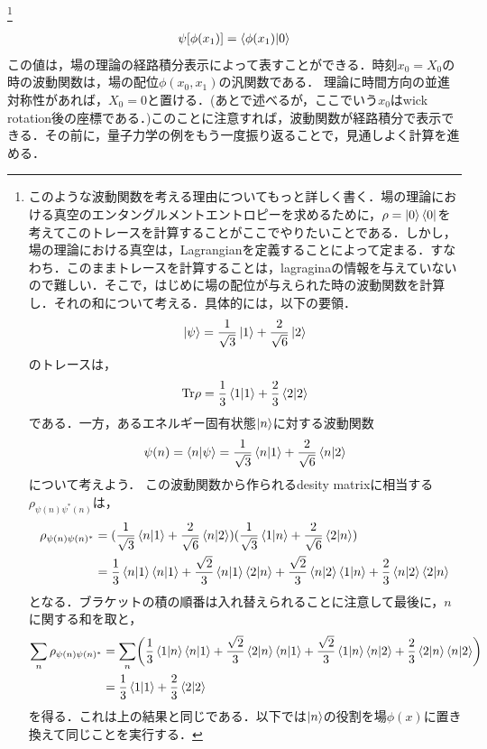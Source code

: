 \footnote{このような波動関数を考える理由についてもっと詳しく書く．場の理論における真空のエンタングルメントエントロピーを求めるために，$\rho=\ket{0}\bra{0}$を考えてこのトレースを計算することがここでやりたいことである．しかし，場の理論における真空は，Lagrangianを定義することによって定まる．すなわち．このままトレースを計算することは，lagraginaの情報を与えていないので難しい．そこで，はじめに場の配位が与えられた時の波動関数を計算し．それの和について考える．具体的には，以下の要領．
\begin{align}
  \ket{\psi}=\frac{1}{\sqrt{3}}\ket{1}+\frac{2}{\sqrt{6}}\ket{2}
\end{align}
のトレースは，
\begin{align}
  \mathrm{Tr}\rho=\frac{1}{3}\braket{1|1}+\frac{2}{3}\braket{2|2}
\end{align}
である．一方，あるエネルギー固有状態$\ket{n}$に対する波動関数
\begin{align}
  \psi(n)=\braket{n|\psi}=\frac{1}{\sqrt{3}}\braket{n|1}+\frac{2}{\sqrt{6}}\braket{n|2}
\end{align}について考えよう．
この波動関数から作られるdesity matrixに相当する$\rho_{\psi(n)\psi^{*}(n)}$は，
\begin{align}
  \rho_{\psi(n)\psi(n)^{*}}&=(\frac{1}{\sqrt{3}}\braket{n|1}+\frac{2}{\sqrt{6}}\braket{n|2})(\frac{1}{\sqrt{3}}\braket{1|n}+\frac{2}{\sqrt{6}}\braket{2|n})\\
  &=\frac{1}{3}\braket{n|1}\braket{n|1}+\frac{\sqrt{2}}{3}\braket{n|1}\braket{2|n}
  +\frac{\sqrt{2}}{3}\braket{n|2}\braket{1|n}+\frac{2}{3}\braket{n|2}\braket{2|n}
\end{align}となる．ブラケットの積の順番は入れ替えられることに注意して最後に，$n$に関する和を取と，
\begin{align}
  \sum_{n}\rho_{\psi(n)\psi(n)^{*}}&=  \sum_{n}\biggl(\frac{1}{3}\braket{1|n}\braket{n|1}+\frac{\sqrt{2}}{3}\braket{2|n}\braket{n|1}
  +\frac{\sqrt{2}}{3}\braket{1|n}\braket{n|2}+\frac{2}{3}\braket{2|n}\braket{n|2}\biggr)\\
  &=\frac{1}{3}\braket{1|1}+\frac{2}{3}\braket{2|2}
\end{align}
を得る．これは上の結果と同じである．以下では$\ket{n}$の役割を場$\phi(x)$に置き換えて同じことを実行する．}
\begin{align}
  \psi[\phi(x_{1})]=\braket{\phi(x_1)|0}
\end{align}
この値は，場の理論の経路積分表示によって表すことができる．時刻$x_0=X_0$の時の波動関数は，場の配位$\phi(x_0,x_1)$の汎関数である．
理論に時間方向の並進対称性があれば，$X_0=0$と置ける．(あとで述べるが，ここでいう$x_0$はwick rotation後の座標である．)このことに注意すれば，波動関数が経路積分で表示できる．その前に，量子力学の例をもう一度振り返ることで，見通しよく計算を進める．

